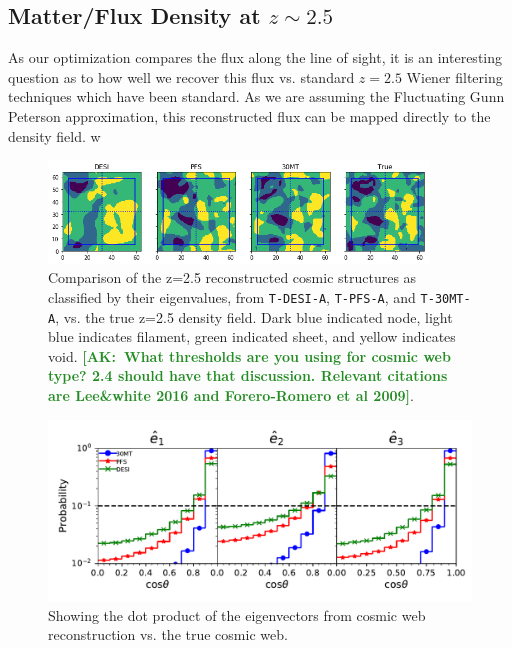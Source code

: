 \documentclass[times]{aastex62}
\newcommand{\ak}[1]{\noindent \textcolor{ForestGreen}{{\bf [AK:~{#1}]}}}
\begin{document}



\subsection{Matter/Flux Density at $z\sim 2.5$}
\label{subsec_z=2.5}
As our optimization compares the flux along the line of sight, it is an interesting question as to how well we recover this flux vs. standard $z=2.5$ Wiener filtering techniques which have been standard. As we are assuming the Fluctuating Gunn Peterson approximation, this reconstructed flux can be mapped directly to the density field.
w

\begin{figure}
  \centering 
  
  \includegraphics[trim=0cm 0cm 0cm 0cm,width=0.90\textwidth]{./figs_treepm/cosmic_structure_z=2.png}
    \caption{Comparison of the z=2.5 reconstructed cosmic structures as classified by their eigenvalues, from \texttt{T-DESI-A}, \texttt{T-PFS-A}, and \texttt{T-30MT-A}, vs. the true z=2.5 density field. Dark blue indicated node, light blue indicates filament, green indicated sheet, and yellow indicates void.
    \ak{What thresholds are you using for  cosmic web type? 2.4 should have that discussion. Relevant citations are Lee&white 2016 and Forero-Romero et al 2009}. } 
    \label{fig_config}
\end{figure}

\begin{figure}
  \centering 
  
  \includegraphics[trim=1cm 0cm 0cm 0cm,width=1.0\textwidth]{./figs_treepm/eigenvectors_z=2.pdf}
    \caption{Showing the dot product of the eigenvectors from cosmic web reconstruction vs. the true cosmic web.} 
    \label{fig_cosmicweb}
\end{figure}
\end{document}
